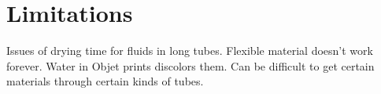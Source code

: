 \section{Limitations}
Issues of drying time for fluids in long tubes.  Flexible material doesn't work forever.  Water in Objet prints discolors them.  Can be difficult to get certain materials through certain kinds of tubes.